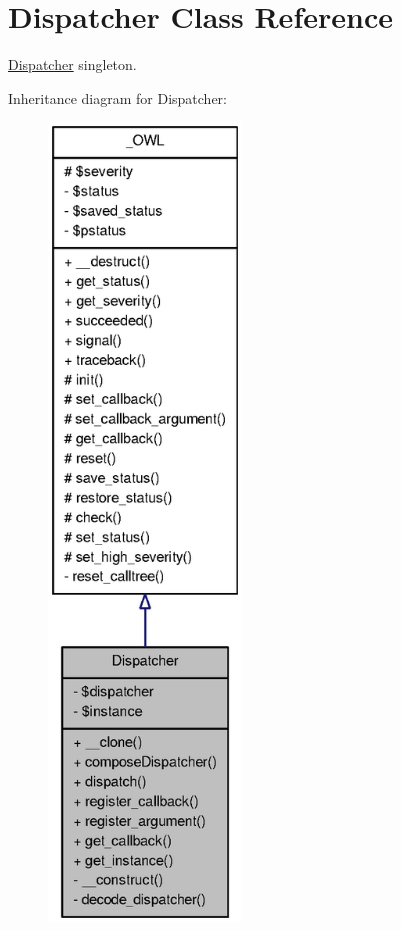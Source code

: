 \section{Dispatcher Class Reference}
\label{classDispatcher}


\hyperlink{classDispatcher}{Dispatcher} singleton.  




Inheritance diagram for Dispatcher:\nopagebreak
\begin{figure}[H]
\begin{center}
\leavevmode
\includegraphics[height=600pt]{classDispatcher__inherit__graph}
\end{center}
\end{figure}



